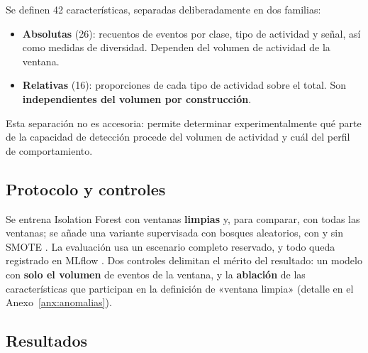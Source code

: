 Se definen 42 características, separadas deliberadamente en dos familias:

\begin{itemize}
    \item \textbf{Absolutas} (26): recuentos de eventos por clase, tipo de actividad y señal,
    así como medidas de diversidad. Dependen del volumen de actividad de la ventana.
    \item \textbf{Relativas} (16): proporciones de cada tipo de actividad sobre el total.
    Son \textbf{independientes del volumen por construcción}.
\end{itemize}

Esta separación no es accesoria: permite determinar experimentalmente qué parte de la
capacidad de detección procede del volumen de actividad y cuál del perfil de comportamiento.

\subsection{Protocolo y controles}

Se entrena Isolation Forest \cite{isolationforest} con ventanas \textbf{limpias} y, para comparar,
con todas las ventanas; se añade una variante supervisada con bosques aleatorios, con y sin
SMOTE \cite{smote}. La evaluación usa un escenario completo reservado, y todo queda registrado en
MLflow \cite{mlflow}. Dos controles delimitan el mérito del resultado: un modelo con
\textbf{solo el volumen} de eventos de la ventana, y la \textbf{ablación} de las características que
participan en la definición de «ventana limpia» (detalle en el Anexo~\ref{anx:anomalias}).

\subsection{Resultados}

